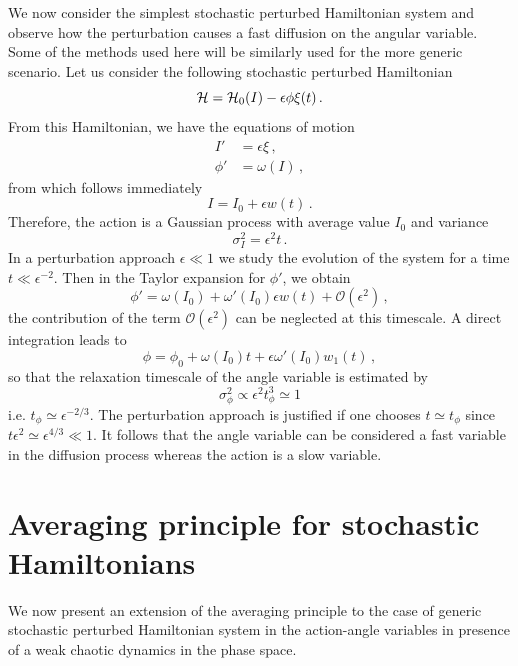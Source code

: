 We now consider the simplest stochastic perturbed Hamiltonian system and observe how the perturbation causes a fast diffusion on the angular variable. Some of the methods used here will be similarly used for the more generic scenario. Let us consider the following stochastic perturbed Hamiltonian
\begin{equation}
	\mathcal{H} = \mathcal{H}_0(I) - \epsilon \phi \xi(t)\,.
\end{equation}
From this Hamiltonian, we have the equations of motion
\begin{equation}
	\begin{aligned}
		{I'} &= \epsilon\xi\,, \\
		{\phi'} &= \omega(I)\,,
	\end{aligned}
\end{equation}
from which follows immediately
\begin{equation}
	I = I_0 + \epsilon w(t)\,.
\end{equation}
Therefore, the action is a Gaussian process with average value $I_0$ and variance
\begin{equation}
	\sigma_{I}^2=\epsilon^2t\,.
\end{equation}
In a perturbation approach $\epsilon\ll 1$ we study the evolution of the system for a time $t\ll \epsilon^{-2}$. Then in the  Taylor expansion for \({\phi'}\), we obtain
\begin{equation}
	{\phi'} = \omega(I_0) + \omega'(I_0)\epsilon w(t) + \mathcal{O}(\epsilon^2)\,,
\end{equation}
the contribution of the term $\mathcal{O}(\epsilon^2)$ can be neglected at this timescale. A direct integration leads to
\begin{equation}
	\phi = \phi_0 + \omega(I_0)t + \epsilon \omega'(I_0) w_1(t)\,,
\end{equation}
so that the relaxation timescale of the angle variable is estimated by
\begin{equation}
	\sigma_{\phi}^2 \propto \epsilon^2 t_\phi^3\simeq 1
\end{equation}
i.e. $t_\phi\simeq \epsilon^{-2/3}$. The perturbation approach is justified if one chooses $t\simeq t_\phi$ since $t\epsilon^2\simeq \epsilon^{4/3}\ll 1$. It follows that the angle variable can be considered a fast variable in the diffusion process whereas the action is a slow variable.

%
\section{Averaging principle for stochastic Hamilto\-nians}\label{sec:diff:averaging_principle}
%
We now present an extension of the averaging principle to the case of generic stochastic perturbed Hamiltonian system in the action-angle variables in presence of a weak chaotic dynamics in the phase space.

